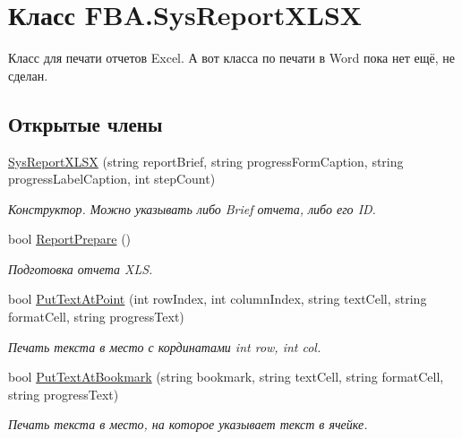 \hypertarget{class_f_b_a_1_1_sys_report_x_l_s_x}{}\section{Класс F\+B\+A.\+Sys\+Report\+X\+L\+SX}
\label{class_f_b_a_1_1_sys_report_x_l_s_x}


Класс для печати отчетов Excel. А вот класса по печати в Word пока нет ещё, не сделан.  


\subsection*{Открытые члены}
\begin{DoxyCompactItemize}
\item 
\mbox{\hyperlink{class_f_b_a_1_1_sys_report_x_l_s_x_a69cf2c47ee5bbf078239d0c972f6c136}{Sys\+Report\+X\+L\+SX}} (string report\+Brief, string progress\+Form\+Caption, string progress\+Label\+Caption, int step\+Count)
\begin{DoxyCompactList}\small\item\em Конструктор. Можно указывать либо Brief отчета, либо его ID. \end{DoxyCompactList}\item 
bool \mbox{\hyperlink{class_f_b_a_1_1_sys_report_x_l_s_x_ab6ae5b89dab6e7dc83519e3156eab3a2}{Report\+Prepare}} ()
\begin{DoxyCompactList}\small\item\em Подготовка отчета X\+LS. \end{DoxyCompactList}\item 
bool \mbox{\hyperlink{class_f_b_a_1_1_sys_report_x_l_s_x_a8de5c72aafc37981a58586f6a49fbc08}{Put\+Text\+At\+Point}} (int row\+Index, int column\+Index, string text\+Cell, string format\+Cell, string progress\+Text)
\begin{DoxyCompactList}\small\item\em Печать текста в место с кординатами int row, int col. \end{DoxyCompactList}\item 
bool \mbox{\hyperlink{class_f_b_a_1_1_sys_report_x_l_s_x_aeed5fca425182b2e9f54418334aaf984}{Put\+Text\+At\+Bookmark}} (string bookmark, string text\+Cell, string format\+Cell, string progress\+Text)
\begin{DoxyCompactList}\small\item\em Печать текста в место, на которое указывает текст в ячейке. \end{DoxyCompactList}\item 

\end{DoxyCompactItemize}
